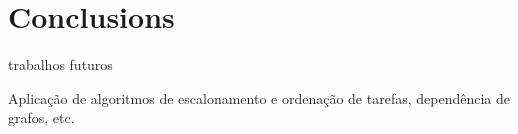 \section{Conclusions}
\label{sec:conclusions}

	\lipsum[2-4]

trabalhos futuros

Aplicação de algoritmos de escalonamento e ordenação de tarefas, dependência de
	grafos, etc.

